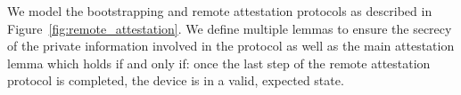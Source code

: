 



  We model the bootstrapping and remote attestation protocols as described in Figure~\ref{fig:remote_attestation}. We define multiple lemmas to ensure the secrecy of the private information involved in the protocol as well as the main attestation lemma which holds if and only if: once the last step of the remote attestation protocol is completed, the \projecttitle{} device is in a valid, expected state. 

